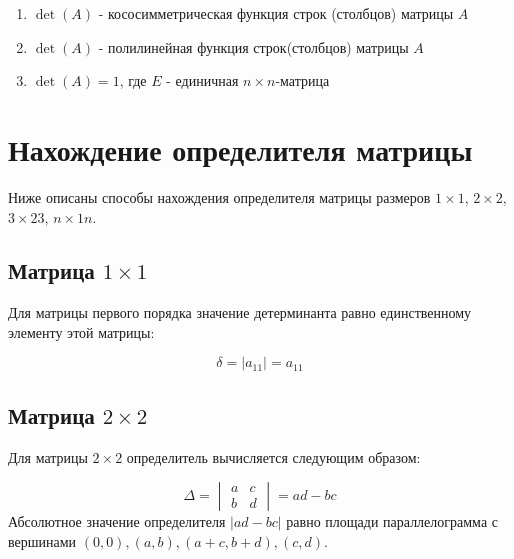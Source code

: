 \documentclass[a4paper,oneside,14pt]{extreport}
\begin{document}
\begin{enumerate}
	\item $\det{(A)}$ - кососимметрическая функция строк (столбцов) матрицы $A$
	\item $\det{(A)}$ - полилинейная функция строк(столбцов) матрицы $A$
	\item $\det{(A)} = 1$, где $E$ - единичная $n \times n$-матрица
\end{enumerate}
	
\section{Нахождение определителя матрицы}
Ниже описаны способы нахождения определителя матрицы размеров $1 \times 1$, $2 \times 2$, $3 \times 23$, $n \times 1n$.

\subsection{Матрица $1 \times 1$}
Для матрицы первого порядка значение детерминанта равно единственному элементу этой матрицы:

\begin{equation}
\label{eq:det_1x1}
\delta  = |a_{11}| = a_{11}
\end{equation}

\subsection{Матрица $2 \times 2$}
Для матрицы $2 \times 2$ определитель вычисляется следующим образом:

\begin{equation}
\label{eq:det_2x2}
\Delta = \begin{vmatrix}
a & c \\
b & d
\end{vmatrix} = ad - bc
\end{equation}
Абсолютное значение определителя $|ad - bc|$ равно площади параллелограмма с вершинами
$(0, 0), (a, b), (a + c, b + d), (c, d)$.
\end{document}
